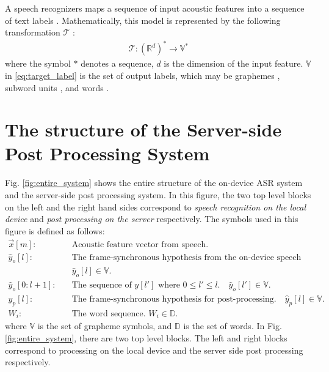 \documentclass{article}
\begin{document}
A speech recognizers maps a sequence of input acoustic features into a sequence 
of text labels  \cite{r_prabhavalkar_interspeech_2017_00}. 
Mathematically, this model is 
represented by the following transformation $\mathcal{T}$ 
\cite{a_graves_icml_2006_00}:
\begin{align}
  \mathcal{T} : \left(\mathbb{R}^d\right)^{*} \rightarrow \mathbb{V}^{*}
	\label{eq:transformation}
\end{align}
where the symbol ${*}$ denotes a sequence, $d$ is the dimension of the input 
feature. $\mathbb{V}$ in \eqref{eq:target_label} is the set of output
labels, which may be graphemes 
\cite{j_chorowski_nips_2015_00,
w_chan_icassp_2016_00},
subword units \cite{
a_zeyer_interspeech_2018_00,
c_chiu_icassp_2018_00},
 and words \cite{h_soltau_interspeech_2017_00}.

 

\section{The structure of the Server-side Post Processing System}

Fig. \ref{fig:entire_system} shows the entire structure of the on-device ASR
system and the server-side post processing system. In this figure,  
the two top level blocks on the left and the right hand sides correspond
to {\it speech recognition on the local device} and 
{\it post processing on the server} respectively.  The symbols used in this 
figure is defined as follows:
%
\begin{align}
  \vec{x}[m]:& \quad \text{Acoustic feature vector from speech.}  \nonumber \\
  \hat{y}_o[l]:& \quad \text{The frame-synchronous hypothesis from the
  on-device speech recognizer.}   \nonumber \\
       & \quad \hat{y}_o[l] \in \mathbb{V}.  \nonumber \\
  \hat{y}_o[0:l+1]  : & \quad \text{The sequence of $y[l']$ where } 0 \le l'
  \le l. \quad  \hat{y}_o[l'] \in \mathbb{V}.  \nonumber \\ 
  y_p[l]:& \quad \text{The frame-synchronous hypothesis for post-processing.}
  \quad \hat{y}_p[l] \in \mathbb{V}.   \nonumber \\
  W_i: & \quad \text{The word sequence. } W_i \in  \mathbb{D}.  \nonumber 
\end{align}
where $\mathbb{V}$ is the set of grapheme symbols, and $\mathbb{D}$ is the
set of words. In Fig. \ref{fig:entire_system}, there are two top level
blocks. The left and right blocks correspond to processing on the local
device and the server side post processing respectively.
\end{document}
